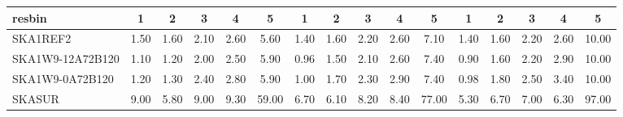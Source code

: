 \begin{table}[!htp]
{{\begin{tabular}{|lccccc||ccccc||ccccc|}
 resbin  &1 & 2 & 3 & 4 & 5 & 1 & 2 & 3 & 4 & 5 & 1 & 2 & 3 & 4 & 5 \tabularnewline \hline
SKA1REF2 & 1.50 \cellcolor{blue!20.13} & 1.60 \cellcolor{red!21.65} & 2.10 \cellcolor{green!18.60} & 2.60 \cellcolor{orange!18.62} & 5.60 \cellcolor{purple!18.00} & 1.40 \cellcolor{blue!21.22} & 1.60 \cellcolor{red!18.91} & 2.20 \cellcolor{green!18.69} & 2.60 \cellcolor{orange!18.00} & 7.10 \cellcolor{purple!18.00} & 1.40 \cellcolor{blue!22.77} & 1.60 \cellcolor{red!18.00} & 2.20 \cellcolor{green!18.00} & 2.60 \cellcolor{orange!18.00} & 10.00 \cellcolor{purple!18.00}\\ \hline 
SKA1W9-12A72B120 & 1.10 \cellcolor{blue!18.00} & 1.20 \cellcolor{red!18.00} & 2.00 \cellcolor{green!18.00} & 2.50 \cellcolor{orange!18.00} & 5.90 \cellcolor{purple!18.24} & 0.96 \cellcolor{blue!18.00} & 1.50 \cellcolor{red!18.00} & 2.10 \cellcolor{green!18.00} & 2.60 \cellcolor{orange!18.00} & 7.40 \cellcolor{purple!18.18} & 0.90 \cellcolor{blue!18.00} & 1.60 \cellcolor{red!18.00} & 2.20 \cellcolor{green!18.00} & 2.90 \cellcolor{orange!21.41} & 10.00 \cellcolor{purple!18.00}\\ \hline 
SKA1W9-0A72B120 & 1.20 \cellcolor{blue!18.53} & 1.30 \cellcolor{red!18.91} & 2.40 \cellcolor{green!20.40} & 2.80 \cellcolor{orange!19.85} & 5.90 \cellcolor{purple!18.24} & 1.00 \cellcolor{blue!18.29} & 1.70 \cellcolor{red!19.83} & 2.30 \cellcolor{green!19.38} & 2.90 \cellcolor{orange!20.17} & 7.40 \cellcolor{purple!18.18} & 0.98 \cellcolor{blue!18.76} & 1.80 \cellcolor{red!19.65} & 2.50 \cellcolor{green!20.62} & 3.40 \cellcolor{orange!27.08} & 10.00 \cellcolor{purple!18.00}\\ \hline 
SKASUR & 9.00 \cellcolor{blue!60.00} & 5.80 \cellcolor{red!60.00} & 9.00 \cellcolor{green!60.00} & 9.30 \cellcolor{orange!60.00} & 59.00 \cellcolor{purple!60.00} & 6.70 \cellcolor{blue!60.00} & 6.10 \cellcolor{red!60.00} & 8.20 \cellcolor{green!60.00} & 8.40 \cellcolor{orange!60.00} & 77.00 \cellcolor{purple!60.00} & 5.30 \cellcolor{blue!60.00} & 6.70 \cellcolor{red!60.00} & 7.00 \cellcolor{green!60.00} & 6.30 \cellcolor{orange!60.00} & 97.00 \cellcolor{purple!60.00}\tabularnewline \hline 
\end{tabular}}\hfil 
{}}
\end{table}
